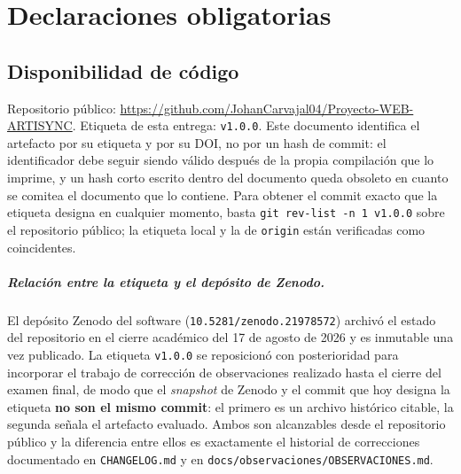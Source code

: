 
\chapter{Declaraciones obligatorias}
\label{cap:declaraciones}

\section{Disponibilidad de código}

Repositorio público:
\url{https://github.com/JohanCarvajal04/Proyecto-WEB-ARTISYNC}. Etiqueta
de esta entrega: \texttt{v1.0.0}. Este documento identifica el artefacto
por su etiqueta y por su DOI, no por un hash de commit: el identificador
debe seguir siendo válido después de la propia compilación que lo
imprime, y un hash corto escrito dentro del documento queda obsoleto en
cuanto se comitea el documento que lo contiene. Para obtener el commit
exacto que la etiqueta designa en cualquier momento, basta
\texttt{git rev-list -n 1 v1.0.0} sobre el repositorio público; la
etiqueta local y la de \texttt{origin} están verificadas como
coincidentes.

\paragraph{Relación entre la etiqueta y el depósito de Zenodo.} El
depósito Zenodo del software (\texttt{10.5281/zenodo.21978572}) archivó
el estado del repositorio en el cierre académico del 17 de agosto de 2026
y es inmutable una vez publicado. La etiqueta \texttt{v1.0.0} se
reposicionó con posterioridad para incorporar el trabajo de corrección de
observaciones realizado hasta el cierre del examen final, de modo que el
\emph{snapshot} de Zenodo y el commit que hoy designa la etiqueta
\textbf{no son el mismo commit}: el primero es un archivo histórico
citable, la segunda señala el artefacto evaluado. Ambos son alcanzables
desde el repositorio público y la diferencia entre ellos es exactamente
el historial de correcciones documentado en \texttt{CHANGELOG.md} y en
\texttt{docs/observaciones/OBSERVACIONES.md}.

